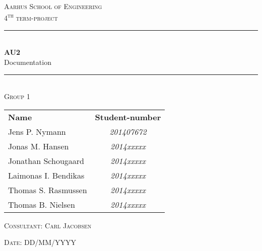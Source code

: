 \newcommand{\HRule}{\rule{\linewidth}{0.1mm}} %

\begin{center}
	
	\textsc{\LARGE Aarhus School of Engineering}\\[1.5cm] %
	
	\textsc{\large 4\textsuperscript{th} term-project}\\[2.5cm] 
	\HRule \\[0.8cm]
	{\huge \bfseries \textsc{AU2}} \\[0.5cm]{\LARGE Documentation} \\[0.4cm]
	\HRule \\[1.5cm]
	
	\textsc{\large Group 1}\\
	\vspace{0.5 in}
	\begin{center}
		\begin{tabular}{l c}
			\textbf{Name} & \textbf{Student-number} \\
			Jens P. Nymann & \textsl{201407672} \\
			Jonas M. Hansen & \textsl{2014xxxxx} \\
			Jonathan Schougaard & \textsl{2014xxxxx} \\
			Laimonas I. Bendikas & \textsl{2014xxxxx} \\
			Thomas S. Rasmussen & \textsl{2014xxxxx} \\
			Thomas B. Nielsen & \textsl{2014xxxxx} \\
		\end{tabular}
	\end{center}
	\vspace{0.5 in}
	
	\textsc{\large Consultant: Carl Jacobsen}
	\vspace{0.5 in}
	
	\textsc{\large Date: DD/MM/YYYY}\\
	
\end{center} %

\newpage